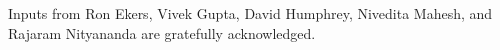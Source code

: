 \documentclass[
  journal=pasa,
  manuscript=article-type,
  year=2020,
  volume=37,
]{cup-journal}
\begin{document}




\begin{acknowledgement}
Inputs from Ron Ekers, Vivek Gupta, David Humphrey, Nivedita Mahesh, and Rajaram Nityananda are gratefully acknowledged. 
\end{acknowledgement}





\end{document}
